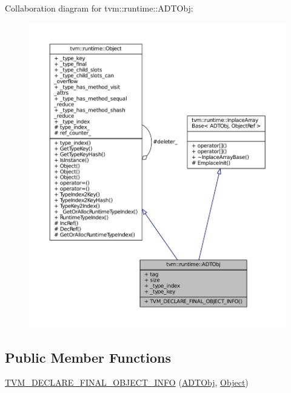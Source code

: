 Collaboration diagram for tvm\+:\+:runtime\+:\+:A\+D\+T\+Obj\+:
\nopagebreak
\begin{figure}[H]
\begin{center}
\leavevmode
\includegraphics[width=350pt]{classtvm_1_1runtime_1_1ADTObj__coll__graph}
\end{center}
\end{figure}
\subsection*{Public Member Functions}
\begin{DoxyCompactItemize}
\item 
\hyperlink{classtvm_1_1runtime_1_1ADTObj_ac282a733d6c69a23a94c3a2bdf8c61c2}{T\+V\+M\+\_\+\+D\+E\+C\+L\+A\+R\+E\+\_\+\+F\+I\+N\+A\+L\+\_\+\+O\+B\+J\+E\+C\+T\+\_\+\+I\+N\+FO} (\hyperlink{classtvm_1_1runtime_1_1ADTObj}{A\+D\+T\+Obj}, \hyperlink{classtvm_1_1runtime_1_1Object}{Object})
\end{DoxyCompactItemize}
